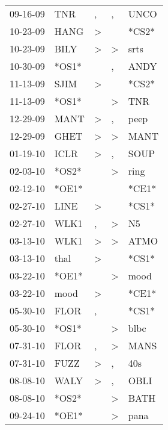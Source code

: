 \begin{supertabular}{lllll}
 09-16-09 &    TNR &                , &                , &   UNCO \\
 10-23-09 &   HANG &     \textgreater &                  &  *CS2* \\
 10-23-09 &   BILY &     \textgreater &     \textgreater &   srts \\
 10-30-09 &  *OS1* &                  &                , &   ANDY \\
 11-13-09 &   SJIM &     \textgreater &                  &  *CS2* \\
 11-13-09 &  *OS1* &                  &     \textgreater &    TNR \\
 12-29-09 &   MANT &     \textgreater &                , &   peep \\
 12-29-09 &   GHET &     \textgreater &     \textgreater &   MANT \\
 01-19-10 &   ICLR &     \textgreater &                , &   SOUP \\
 02-03-10 &  *OS2* &                  &     \textgreater &   ring \\
 02-12-10 &  *OE1* &                  &                  &  *CE1* \\
 02-27-10 &   LINE &     \textgreater &                  &  *CS1* \\
 02-27-10 &   WLK1 &                , &     \textgreater &     N5 \\
 03-13-10 &   WLK1 &     \textgreater &     \textgreater &   ATMO \\
 03-13-10 &   thal &     \textgreater &                  &  *CS1* \\
 03-22-10 &  *OE1* &                  &     \textgreater &   mood \\
 03-22-10 &   mood &     \textgreater &                  &  *CE1* \\
 05-30-10 &   FLOR &                , &                  &  *CS1* \\
 05-30-10 &  *OS1* &                  &     \textgreater &   blbc \\
 07-31-10 &   FLOR &                , &     \textgreater &   MANS \\
 07-31-10 &   FUZZ &     \textgreater &                , &    40s \\
 08-08-10 &   WALY &     \textgreater &                , &   OBLI \\
 08-08-10 &  *OS2* &                  &     \textgreater &   BATH \\
 09-24-10 &  *OE1* &                  &     \textgreater &   pana \\

\end{supertabular}
